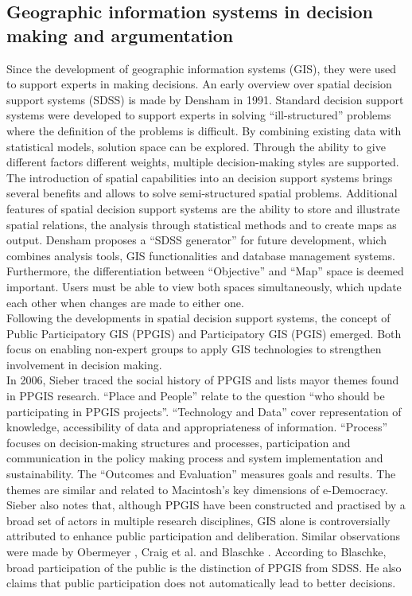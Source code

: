 \subsection{Geographic information systems in decision making and argumentation}
\label{subchap:gis_stuff}
Since the development of geographic information systems (GIS), they were used to support experts in making decisions. An early overview over spatial decision support systems (SDSS) is made by Densham \cite{densham_sdss} in 1991. Standard decision support systems were developed to support experts in solving ``ill-structured'' problems where the definition of the problems is difficult. By combining existing data with statistical models, solution space can be explored. Through the ability to give different factors different weights, multiple decision-making styles are supported. The introduction of spatial capabilities into an decision support systems brings several benefits and allows to solve semi-structured spatial problems. Additional features of spatial decision support systems are the ability to store and illustrate spatial relations, the analysis through statistical methods and to create maps as output. Densham proposes a ``SDSS generator'' for future development, which combines analysis tools, GIS functionalities and database management systems. Furthermore, the differentiation between ``Objective'' and ``Map'' space is deemed important. Users must be able to view both spaces simultaneously, which update each other when changes are made to either one.\\
Following the developments in spatial decision support systems, the concept of Public Participatory GIS (PPGIS) and Participatory GIS (PGIS) emerged. Both focus on enabling non-expert groups to apply GIS technologies to strengthen involvement in decision making.\\
In 2006, Sieber \cite{Sieber2006_PublicParticipationGIS} traced the social history of PPGIS and lists mayor themes found in PPGIS research. ``Place and People'' relate to the question ``who should be participating in PPGIS projects''. ``Technology and Data'' cover representation of knowledge, accessibility of data and appropriateness of information. ``Process'' focuses on decision-making structures and processes, participation and communication in the policy making process and system implementation and sustainability. The ``Outcomes and Evaluation'' measures goals and results. The themes are similar and related to Macintosh's \cite{Macintosh2004_eParticipation_characterization} key dimensions of e-Democracy. Sieber also notes that, although PPGIS have been constructed and practised by a broad set of actors in multiple research disciplines, GIS alone is controversially attributed to enhance public participation and deliberation. Similar observations were made by Obermeyer \cite{obermeyer1998evolution}, Craig et al. \cite{Weiner2002_Participation_and_GIS_eigentlich_Craig} and Blaschke \cite{Blaschke2004_PGIS_critically_revised}. According to Blaschke, broad participation of the public is the distinction of PPGIS from SDSS. He also claims that public participation does not automatically lead to better decisions.\\
